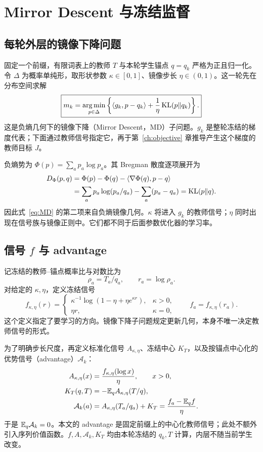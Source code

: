 \chapter{Mirror Descent 与冻结监督}
\label{ch:mirror}
\section{每轮外层的镜像下降问题}
固定一个前缀，有限词表上的教师 $T$ 与本轮学生锚点 $q=q_k$ 严格为正且归一化。令 $\Delta$ 为概率单纯形，取形状参数 $\kappa\in[0,1]$、镜像步长 $\eta\in(0,1)$。这一轮先在分布空间求解
\begin{equation}
\boxed{
m_k=\operatorname*{arg\,min}_{p\in\Delta}
\left\{\langle g_k,p-q_k\rangle
+\frac1\eta\operatorname{KL}(p\Vert q_k)\right\}.
}
\label{eq:MD}
\end{equation}
这是负熵几何下的镜像下降（Mirror Descent，MD）子问题。$g_k$ 是整轮冻结的梯度代表；下面通过教师信号指定它，再于第~\ref{ch:objective} 章推导产生这个梯度的教师目标 $J$。

负熵势为 $\Phi(p)=\sum_ap_a\log p_a$。其 Bregman 散度逐项展开为
\begin{align}
D_\Phi(p,q)
&=\Phi(p)-\Phi(q)-\langle\nabla\Phi(q),p-q\rangle\\
&=\sum_ap_a\log(p_a/q_a)-\sum_a(p_a-q_a)
=\operatorname{KL}(p\Vert q).
\end{align}
因此式~\eqref{eq:MD} 的第二项来自负熵镜像几何。$\kappa$ 将进入 $g_k$ 的教师信号；$\eta$ 同时出现在信号族与镜像正则中。它们都不同于后面参数优化器的学习率。

\section{信号 \texorpdfstring{$f$}{f} 与 advantage}
记冻结的教师--锚点概率比与对数比为
\begin{equation}
\rho_a=T_a/q_a,\qquad r_a=\log\rho_a.
\end{equation}
对给定的 $\kappa,\eta$，定义冻结信号
\begin{equation}
f_{\kappa,\eta}(r)=
\begin{cases}
\kappa^{-1}\log(1-\eta+\eta e^{\kappa r}),&\kappa>0,\\
\eta r,&\kappa=0,
\end{cases}
\qquad f_a=f_{\kappa,\eta}(r_a).
\label{eq:signal}
\end{equation}
这个定义指定了要学习的方向。镜像下降子问题规定更新几何，本身不唯一决定教师信号的形式。

为了明确步长尺度，再定义标准化信号 $A_{\kappa,\eta}$、冻结中心 $K_T$，以及按锚点中心化的优势信号（advantage）$\mathcal A_k$：
\begin{align}
A_{\kappa,\eta}(x)&=\frac{f_{\kappa,\eta}(\log x)}{\eta},\qquad x>0,\\
K_T(q,T)&=-\mathbb E_qA_{\kappa,\eta}(T/q),\\
\mathcal A_k(a)&=A_{\kappa,\eta}(T_a/q_a)+K_T
=\frac{f_a-\mathbb E_qf}{\eta}.
\label{eq:advantage}
\end{align}
于是 $\mathbb E_q\mathcal A_k=0$。本文的 advantage 是固定前缀上的中心化教师信号；此处不额外引入序列价值函数。$f,A,\mathcal A_k,K_T$ 均由本轮冻结的 $q_k,T$ 计算，内层不随当前学生改变。

